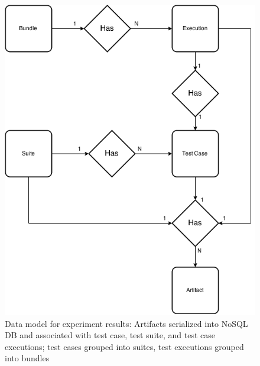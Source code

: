 \begin{figure}[ht]
\includegraphics[width=\linewidth]{images/DataModel.png}
\caption{Data model for experiment results: Artifacts serialized into NoSQL DB and associated with test case, test suite, and test case executions; test cases grouped into suites, test executions grouped into bundles}
\label{fig:data}
\end{figure}

